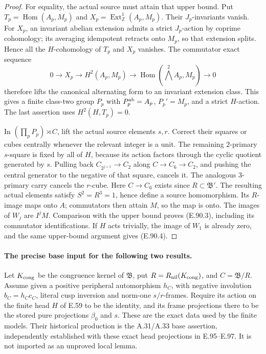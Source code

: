 \begin{proof}
For equality, the actual source must attain that upper bound.
Put \(T_p=\operatorname{Hom}(A_p,M_p)\) and
\(X_p=\operatorname{Ext}^1_{\mathbb Z}(A_p,M_p)\).
Their \(J_p\)-invariants vanish.  For \(X_p\), an invariant
abelian extension admits a strict \(J_p\)-action by coprime
cohomology; its averaging idempotent retracts onto \(M_p\),
so that extension splits.  Hence all the \(H\)-cohomology of
\(T_p\) and \(X_p\) vanishes.
The commutator exact sequence
\[
 0\to X_p\to H^2(A_p,M_p)\to
       \operatorname{Hom}(\bigwedge^2A_p,M_p)\to0
                                                        \tag{E.90.6}
\]
therefore lifts the canonical alternating form to an invariant
extension class.  This gives a finite class-two group \(P_p\)
with \(P_p^{\rm ab}=A_p\), \(P_p'=M_p\), and a strict \(H\)-action.
The last assertion uses \(H^2(H,T_p)=0\).

In \((\prod_pP_p)\rtimes C\), lift the actual source elements
\(s,r\).  Correct their squares or cubes centrally whenever the
relevant integer is a unit.  The remaining \(2\)-primary
\(s\)-square is fixed by all of \(H\), because its action factors
through the cyclic quotient generated by \(s\).  Pulling back
\(C_{2^{j+1}}\to C_2\) along \(C\to C_6\to C_2\), and pushing
the central generator to the negative of that square, cancels it.
The analogous \(3\)-primary carry cancels the \(r\)-cube.
Here \(C\to C_6\) exists since \(R\subset\mathfrak B'\).
The resulting actual elements satisfy \(S^2=R^3=1\), hence
define a source homomorphism.  Its \(R\)-image maps onto \(A\);
commutators then attain \(M\), so the map is onto.
The images of \(W_j\) are \(I^jM\).  Comparison with the upper
bound proves (E.90.3), including its commutator identifications.
If \(H\) acts trivially, the image of \(W_1\) is already zero,
and the same upper-bound argument gives (E.90.4).
\end{proof}

\paragraph{The precise base input for the following two results.}
Let \(K_{\rm cong}\) be the congruence kernel of \(\mathfrak B\),
put \(R=R_{\rm nil}(K_{\rm cong})\), and \(C=\mathfrak B/R\).
Assume given a positive peripheral automorphism \(h_C\), with
negative involution \(b_C=h_Cc_C\), literal cusp inversion and
norm-one \(s/r\)-frames.  Require its action on the finite
head \(H\) of E.59 to be the identity, and its frame projections
there to be the stored pure projections \(\beta_0\) and \(s\).
These are the exact data used by the finite models.
Their historical production is the A.31/A.33 base assertion,
independently established with these exact head projections in
E.95--E.97.  It is not imported as an unproved local lemma.

